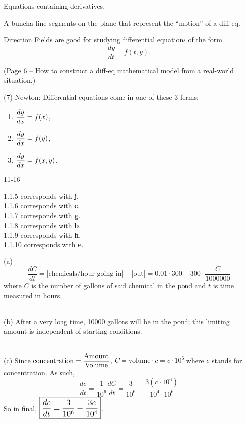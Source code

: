 \documentclass[../../diff_eqs.tex]{subfiles}
\begin{document}
\begin{definition}
    Equations containing derivatives.
\end{definition}

\begin{definition}
    A buncha line segments on the plane that represent the ``motion'' of a diff-eq.
\end{definition}

Direction Fields are good for studying differential equations of the form $$\frac{dy}{dt} = f(t, y)\text{.}$$

(Page 6 -- How to construct a diff-eq mathematical model from a real-world situation.)

(7) Newton: Differential equations come in one of these 3 forms:
\begin{enumerate}
    \item $\mathlarger{ \frac{dy}{dx} = f(x) }$,
    \item $\mathlarger{ \frac{dy}{dx} = f(y) }$,
    \item $\mathlarger{ \frac{dy}{dx} = f(x, y) }$.
\end{enumerate}


\hr

\begin{exercise}{11-16}

    1.1.5 corresponds with \textbf{j}. \\
    1.1.6 corresponds with \textbf{c}.   \\
    1.1.7 corresponds with \textbf{g}.   \\
    1.1.8 corresponds with \textbf{b}.   \\
    1.1.9 corresponds with \textbf{h}.   \\
    1.1.10 corresponds with \textbf{e}.
\end{exercise}

\begin{exercise}{17}

    (a) $$\frac{dC}{dt} = \text{[chemicals/hour going in]} - \text{[out]} = 0.01 \cdot 300 - 300 \cdot \frac{C}{1000000}$$ where $C$ is the number of gallons of said chemical in the pond and $t$ is time measured in hours.

    \phantom \\ 

    (b) After a very long time, 10000 gallons will be in the pond; this limiting amount is independent of starting conditions. 

    \phantom \\ 

    (c) Since $\mathlarger{ \text{concentration} = \frac{\text{Amount}}{\text{Volume}} }$, $C = \text{volume} \cdot c = c\cdot 10^6$ where $c$ stands for concentration. As such, $$\frac{dc}{dt} = \frac{1}{10^6} \frac{dC}{dt} = \frac{3}{10^6} - \frac{3(c \cdot 10^6)}{10^4 \cdot 10^6}$$
    So in final, $\boxed{\mathlarger{\frac{dc}{dt} = \frac{3}{10^6} - \frac{3c}{10^4}}}$.
\end{exercise}
\end{document}
